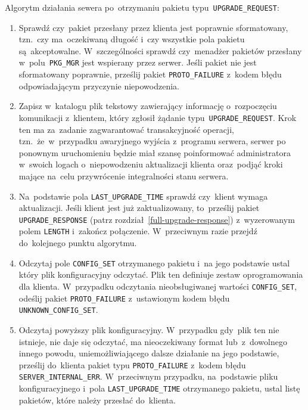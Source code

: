 \documentclass[thesis]{subfiles}
\begin{document}
Algorytm działania sewera po~otrzymaniu pakietu typu~\texttt{UPGRADE\_REQUEST}:\mynobreakpar
\begin{enumerate}
	\item Sprawdź czy~pakiet przesłany przez klienta jest poprawnie sformatowany, tzn.~czy ma~oczekiwaną długość i~czy wszystkie pola pakietu są~akceptowalne. W~szczególności sprawdź czy~menadżer pakietów przesłany w~polu~\texttt{PKG\_MGR} jest wspierany przez serwer. Jeśli pakiet nie jest sformatowany poprawnie, prześlij pakiet \texttt{PROTO\_FAILURE} z~kodem błędu odpowiadającym przyczynie niepowodzenia.
	\item\label{create-file} Zapisz w~katalogu  plik tekstowy zawierający informację o~rozpoczęciu komunikacji z~klientem, który zgłosił żądanie typu~\texttt{UPGRADE\_REQUEST}. Krok ten ma za~zadanie zagwarantować transakcyjność operacji, tzn.~że~w~przypadku awaryjnego wyjścia z~programu serwera, serwer po ponownym uruchomieniu będzie miał szansę poinformować administratora w~swoich logach o~niepowodzeniu aktualizacji klienta oraz~podjąć kroki mające na~celu przywrócenie integralności stanu serwera.
	\item Na~podstawie pola \texttt{LAST\_UPGRADE\_TIME} sprawdź czy~klient wymaga aktualizacji. Jeśli klient jest już zaktualizowany, to~prześlij pakiet \texttt{UPGRADE\_RESPONSE} (patrz rozdział~\ref{full-upgrade-response}) z~wyzerowanym polem \texttt{LENGTH} i~zakończ połączenie. W~przeciwnym razie przejdź do~kolejnego punktu algorytmu.
	\item Odczytaj pole \texttt{CONFIG\_SET} otrzymanego pakietu i~na jego podstawie ustal który plik konfiguracyjny odczytać. Plik ten definiuje zestaw oprogramowania dla klienta. W~przypadku odczytania nieobsługiwanej wartości \texttt{CONFIG\_SET}, odeślij pakiet \texttt{PROTO\_FAILURE} z~ustawionym kodem błędu \texttt{UNKNOWN\_CONFIG\_SET}.
	\item Odczytaj powyższy plik konfiguracyjny. W~przypadku gdy~plik ten nie istnieje, nie daje się odczytać, ma nieoczekiwany format lub~z~dowolnego innego powodu, uniemożliwiającego dalsze działanie na jego podstawie, prześlij do~klienta pakiet typu \texttt{PROTO\_FAILURE} z~kodem błędu \texttt{SERVER\_INTERNAL\_ERR}. W~przeciwnym przypadku, na~podstawie pliku konfiguracyjnego i~pola \texttt{LAST\_UPGRADE\_TIME} otrzymanego pakietu, ustal listę pakietów, które należy przesłać do~klienta.

\end{enumerate}
\end{document}
